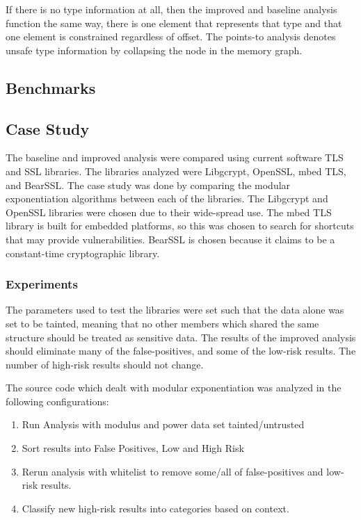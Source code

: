 \documentclass[11pt,a4paper]{article}
\begin{document}
If there is no type information at all, then the improved and baseline analysis
function the same way, there is one element that represents that type and that
one element is constrained regardless of offset. The points-to analysis denotes
unsafe type information by collapsing the node in the memory graph.
\subsection{Benchmarks}

\subsection{Case Study}

The baseline and improved analysis were compared using current software TLS and
SSL libraries. The libraries analyzed were Libgcrypt, OpenSSL, mbed TLS, and
BearSSL. The case study was done by comparing the modular exponentiation
algorithms between each of the libraries. The Libgcrypt and OpenSSL libraries
were chosen due to their wide-spread use. The mbed TLS library is built for
embedded platforms, so this was chosen to search for shortcuts that may provide
vulnerabilities. BearSSL is chosen because it claims to be a constant-time
cryptographic library.

\subsubsection{Experiments}
The parameters used to test the libraries were set such that the data alone was
set to be tainted, meaning that no other members which shared the same structure
should be treated as sensitive data. The results of the improved analysis should
eliminate many of the false-positives, and some of the low-risk results. The
number of high-risk results should not change.

The source code which dealt with modular exponentiation was analyzed in the
following configurations:
\begin{enumerate}

\item Run Analysis with modulus and power data set tainted/untrusted
\item Sort results into False Positives, Low and High Risk
\item Rerun analysis with whitelist to remove some/all of false-positives and
low-risk results.
\item Classify new high-risk results into categories based on context.
\end{enumerate}
\end{document}
